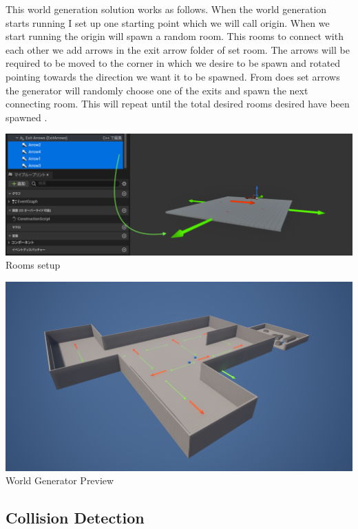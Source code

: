 \documentclass[10pt, letterpaper]{article}
\begin{document}
\begin{Form}
	This world generation solution works as follows. When the world generation starts running I set up one starting
	point which we will call origin. When we start running the origin will spawn a random room. This rooms to connect
	with each other we add arrows in the exit arrow folder of set room. The arrows will be required to be moved to the
	corner in which we desire to be spawn and rotated pointing towards the direction we want it to be spawned. From
	does set arrows the generator will randomly choose one of the exits and spawn the next connecting room. This will
	repeat until the total desired rooms desired have been spawned \parencite{HowToCreateEpicProceduralDungeons}.

	\begin{center}
		\includegraphics[scale=0.3]{IMG/ExitsPreview.png} \\
		Rooms setup\\

		\vspace{0.4cm}

		\includegraphics[scale=0.25]{IMG/ProceduralPreviewPic.png} \\
		World Generator Preview
	\end{center}

	\subsection{Collision Detection}


\end{Form}
\end{document}
